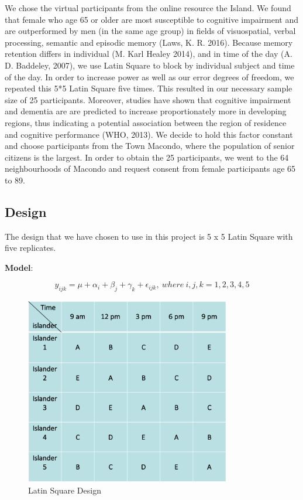 \documentclass[]{article}
\begin{document}
We chose the virtual participants from the online resource the Island.
We found that female who age 65 or older are most susceptible to
cognitive impairment and are outperformed by men (in the same age group)
in fields of visuospatial, verbal processing, semantic and episodic
memory (Laws, K. R. 2016). Because memory retention differs in
individual (M. Karl Healey 2014), and in time of the day (A. D.
Baddeley, 2007), we use Latin Square to block by individual subject and
time of the day. In order to increase power as well as our error degrees
of freedom, we repeated this 5*5 Latin Square five times. This resulted
in our necessary sample size of 25 participants. Moreover, studies have
shown that cognitive impairment and dementia are are predicted to
increase proportionately more in developing regions, thus indicating a
potential association between the region of residence and cognitive
performance (WHO, 2013). We decide to hold this factor constant and
choose participants from the Town Macondo, where the population of
senior citizens is the largest. In order to obtain the 25 participants,
we went to the 64 neighbourhoods of Macondo and request consent from
female participants age 65 to 89.

\subsection{Design}\label{design}

The design that we have chosen to use in this project is 5 x 5 Latin
Square with five replicates.

\textbf{Model}:

\[y_{ijk} = \mu + \alpha_{i} + \beta_{j} + \gamma_{k} + \epsilon_{ijk},\ where\  i, j, k = 1, 2, 3, 4, 5\]

\begin{figure}
\centering
\includegraphics[width=0.80000\textwidth]{Square.png}
\caption{Latin Square Design}
\end{figure}
\end{document}
